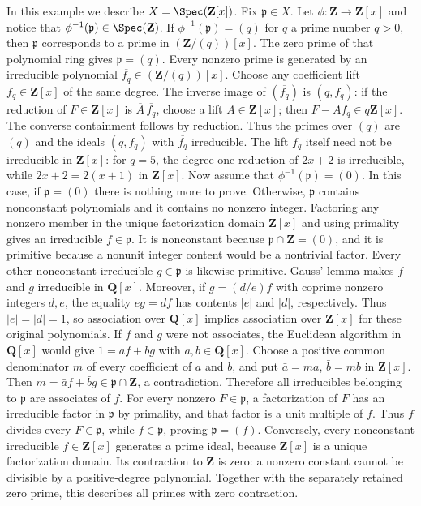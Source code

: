 \begin{example}
\label{example-spec-Zx}
In this example we describe $X = \Spec(\mathbf{Z}[x])$.
Fix $\mathfrak p \in X$.
Let $\phi : \mathbf{Z} \to \mathbf{Z}[x]$ and notice
that $\phi^{-1}(\mathfrak p) \in \Spec(\mathbf{Z})$.
If $\phi^{-1}(\mathfrak p) = (q)$ for $q$ a prime number $q > 0$,
then $\mathfrak p$ corresponds to a prime in $(\mathbf{Z}/(q))[x]$.
The zero prime of that polynomial ring gives $\mathfrak p=(q)$.
Every nonzero prime is generated by an irreducible polynomial
$\overline{f_q}\in(\mathbf{Z}/(q))[x]$.
Choose any coefficient lift $f_q\in\mathbf{Z}[x]$ of the same degree.
The inverse image of $(\overline{f_q})$ is $(q,f_q)$: if the reduction
of $F\in\mathbf Z[x]$ is $\overline A\,\overline{f_q}$, choose a lift
$A\in\mathbf Z[x]$; then $F-Af_q\in q\mathbf Z[x]$.
The converse containment follows by reduction.
Thus the primes over $(q)$ are $(q)$ and the ideals $(q,f_q)$ with
$\overline{f_q}$ irreducible. The lift $f_q$ itself need not be
irreducible in $\mathbf Z[x]$: for $q=5$, the degree-one reduction
of $2x+2$ is irreducible, while $2x+2=2(x+1)$ in $\mathbf Z[x]$.
Now assume that $\phi^{-1}(\mathfrak p)=(0)$.
In this case, if $\mathfrak p = (0)$ there is nothing more to prove. Otherwise, $\mathfrak p$ contains nonconstant polynomials
and it contains no nonzero integer. Factoring any nonzero member
in the unique factorization domain $\mathbf Z[x]$ and using primality
gives an irreducible $f\in\mathfrak p$. It is nonconstant because
$\mathfrak p\cap\mathbf Z=(0)$, and it is primitive because a
nonunit integer content would be a nontrivial factor.
Every other nonconstant irreducible $g\in\mathfrak p$ is likewise primitive.
Gauss' lemma makes $f$ and $g$ irreducible in $\mathbf Q[x]$.
Moreover, if $g=(d/e)f$ with coprime nonzero integers $d,e$,
the equality $eg=df$ has contents $|e|$ and $|d|$, respectively.
Thus $|e|=|d|=1$, so association over $\mathbf Q[x]$ implies
association over $\mathbf Z[x]$ for these original polynomials.
If $f$ and $g$ were not associates, the Euclidean algorithm in
$\mathbf Q[x]$ would give $1=af+bg$ with $a,b\in\mathbf Q[x]$.
Choose a positive common denominator $m$ of every coefficient of
$a$ and $b$, and put $\bar a=ma$, $\bar b=mb$ in $\mathbf Z[x]$.
Then $m=\bar a f+\bar b g\in\mathfrak p\cap\mathbf Z$, a contradiction.
Therefore all irreducibles belonging to $\mathfrak p$ are associates of $f$.
For every nonzero $F\in\mathfrak p$, a factorization of $F$ has
an irreducible factor in $\mathfrak p$ by primality, and that factor
is a unit multiple of $f$. Thus $f$ divides every $F\in\mathfrak p$,
while $f\in\mathfrak p$, proving $\mathfrak p=(f)$.
Conversely, every nonconstant irreducible $f\in\mathbf Z[x]$
generates a prime ideal, because $\mathbf Z[x]$ is a unique
factorization domain. Its contraction to $\mathbf Z$ is zero:
a nonzero constant cannot be divisible by a positive-degree polynomial.
Together with the separately retained zero prime, this describes
all primes with zero contraction.
\end{example}